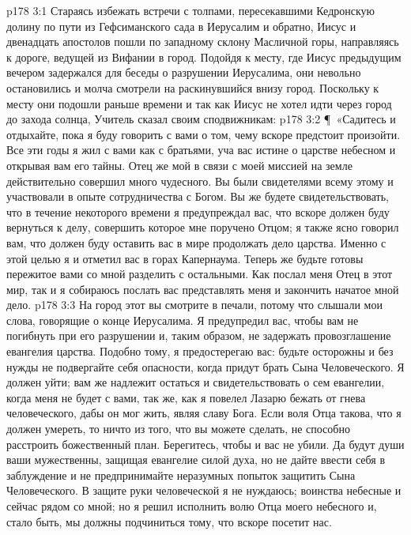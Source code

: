 \vs p178 3:1 Стараясь избежать встречи с толпами, пересекавшими Кедронскую долину по пути из Гефсиманского сада в Иерусалим и обратно, Иисус и двенадцать апостолов пошли по западному склону Масличной горы, направляясь к дороге, ведущей из Вифании в город. Подойдя к месту, где Иисус предыдущим вечером задержался для беседы о разрушении Иерусалима, они невольно остановились и молча смотрели на раскинувшийся внизу город. Поскольку к месту они подошли раньше времени и так как Иисус не хотел идти через город до захода солнца, Учитель сказал своим сподвижникам:
\vs p178 3:2 \P\ «Садитесь и отдыхайте, пока я буду говорить с вами о том, чему вскоре предстоит произойти. Все эти годы я жил с вами как с братьями, уча вас истине о царстве небесном и открывая вам его тайны. Отец же мой в связи с моей миссией на земле действительно совершил много чудесного. Вы были свидетелями всему этому и участвовали в опыте сотрудничества с Богом. Вы же будете свидетельствовать, что в течение некоторого времени я предупреждал вас, что вскоре должен буду вернуться к делу, совершить которое мне поручено Отцом; я также ясно говорил вам, что должен буду оставить вас в мире продолжать дело царства. Именно с этой целью я и отметил вас в горах Капернаума. Теперь же будьте готовы пережитое вами со мной разделить с остальными. Как послал меня Отец в этот мир, так и я собираюсь послать вас представлять меня и закончить начатое мной дело.
\vs p178 3:3 На город этот вы смотрите в печали, потому что слышали мои слова, говорящие о конце Иерусалима. Я предупредил вас, чтобы вам не погибнуть при его разрушении и, таким образом, не задержать провозглашение евангелия царства. Подобно тому, я предостерегаю вас: будьте осторожны и без нужды не подвергайте себя опасности, когда придут брать Сына Человеческого. Я должен уйти; вам же надлежит остаться и свидетельствовать о сем евангелии, когда меня не будет с вами, так же, как я повелел Лазарю бежать от гнева человеческого, дабы он мог жить, являя славу Бога. Если воля Отца такова, что я должен умереть, то ничто из того, что вы можете сделать, не способно расстроить божественный план. Берегитесь, чтобы и вас не убили. Да будут души ваши мужественны, защищая евангелие силой духа, но не дайте ввести себя в заблуждение и не предпринимайте неразумных попыток защитить Сына Человеческого. В защите руки человеческой я не нуждаюсь; воинства небесные и сейчас рядом со мной; но я решил исполнить волю Отца моего небесного и, стало быть, мы должны подчиниться тому, что вскоре посетит нас.
